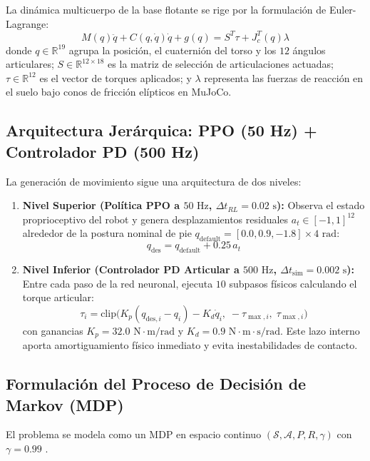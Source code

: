 \documentclass[12pt,a4paper]{article}
\begin{document}
La dinámica multicuerpo de la base flotante se rige por la formulación de Euler-Lagrange:
\begin{equation}
    M(q)\ddot{q} + C(q, \dot{q})\dot{q} + g(q) = S^T \tau + J_c^T(q)\lambda
\end{equation}
donde $q \in \mathbb{R}^{19}$ agrupa la posición, el cuaternión del torso y los $12$ ángulos articulares; $S \in \mathbb{R}^{12 \times 18}$ es la matriz de selección de articulaciones actuadas; $\tau \in \mathbb{R}^{12}$ es el vector de torques aplicados; y $\lambda$ representa las fuerzas de reacción en el suelo bajo conos de fricción elípticos en MuJoCo.

\subsection{Arquitectura Jerárquica: PPO (50 Hz) + Controlador PD (500 Hz)}
La generación de movimiento sigue una arquitectura de dos niveles:
\begin{enumerate}
    \item \textbf{Nivel Superior (Política PPO a $50\text{ Hz}$, $\Delta t_{RL} = 0.02\text{ s}$):} Observa el estado proprioceptivo del robot y genera desplazamientos residuales $a_t \in [-1, 1]^{12}$ alrededor de la postura nominal de pie $q_{\text{default}} = [0.0, 0.9, -1.8]\times 4\text{ rad}$:
    \begin{equation}
        q_{\text{des}} = q_{\text{default}} + 0.25\,a_t
    \end{equation}
    \item \textbf{Nivel Inferior (Controlador PD Articular a $500\text{ Hz}$, $\Delta t_{\text{sim}} = 0.002\text{ s}$):} Entre cada paso de la red neuronal, ejecuta $10$ subpasos físicos calculando el torque articular:
    \begin{equation}
        \tau_i = \text{clip}\Big(K_p (q_{\text{des}, i} - q_i) - K_d \dot{q}_i,\; -\tau_{\max, i},\; \tau_{\max, i}\Big)
    \end{equation}
    con ganancias $K_p = 32.0\text{ N}\cdot\text{m/rad}$ y $K_d = 0.9\text{ N}\cdot\text{m}\cdot\text{s/rad}$. Este lazo interno aporta amortiguamiento físico inmediato y evita inestabilidades de contacto.
\end{enumerate}

\subsection{Formulación del Proceso de Decisión de Markov (MDP)}
El problema se modela como un MDP en espacio continuo $(\mathcal{S}, \mathcal{A}, P, R, \gamma)$ con $\gamma = 0.99$ \cite{sutton2018}.
\end{document}
